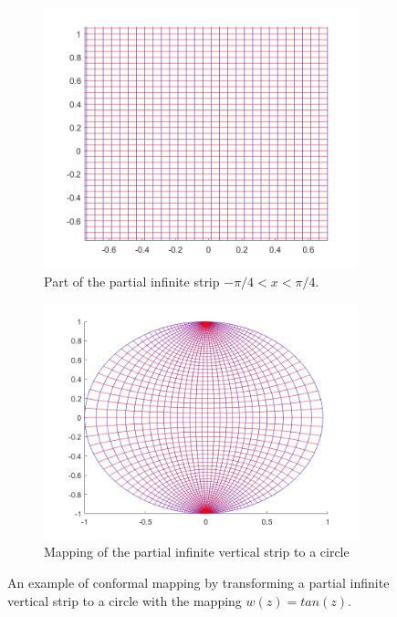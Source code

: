    \begin{figure}[h]
    \centering
    \begin{subfigure}[b]{0.45\textwidth}
        \centering
        \includegraphics[width=\textwidth]{images/tanMappingStrip.png}
        \caption{Part of the partial infinite strip $-\pi/4<x<\pi/4$.}
    \end{subfigure}
    \hfill
    \begin{subfigure}[b]{0.45\textwidth}
        \centering
        \includegraphics[width=\textwidth]{images/tanMapping.png}
        \caption{Mapping of the partial infinite vertical strip to a circle }
    \end{subfigure} 
    \caption[Conformal mapping of vertical strip to circle]{An example of conformal mapping by transforming a partial infinite vertical strip to a circle with the mapping $w(z) = tan(z)$.}
    \label{apx:apx:fig:circleMapping}
 \end{figure}
  
